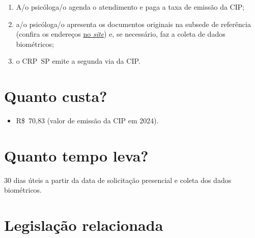 \begin{enumerate}
	\item
	A/o psicóloga/o agenda o atendimento e paga a taxa de emissão da CIP;
	\item
	a/o psicóloga/o apresenta os documentos originais na subsede de referência (confira os endereços
	\href{https://www.crpsp.org/sede/index}{no \emph{site}}) e, se necessário, faz a coleta de dados biométricos;
	\item
	o CRP~SP emite a segunda via da CIP.
\end{enumerate}

\section{Quanto custa?}

\begin{itemize}
	\item
	R\$~70,83 (valor de emissão da CIP em 2024).
\end{itemize}

\section{Quanto tempo leva?}

30 dias úteis a partir da data de solicitação presencial e coleta dos dados biométricos.

\section{Legislação relacionada}

